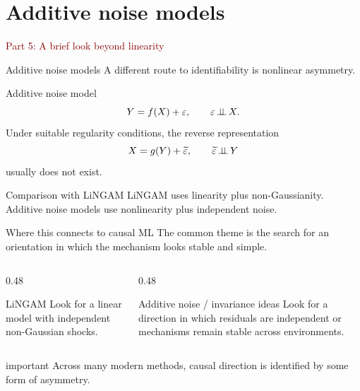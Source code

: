 \documentclass[dvipsnames,aspectratio=169,handout]{beamer}
\begin{document}

\section{Additive noise models}

\begin{frame}{}
\begin{center}
{\Huge \textcolor{DarkRed}{Part 5: A brief look beyond linearity}}
\end{center}
\end{frame}

\begin{frame}{Additive noise models}
A different route to identifiability is nonlinear asymmetry.

\begin{block}{Additive noise model}
\[
Y = f(X) + \varepsilon,
\qquad
\varepsilon \mbox{\,$\perp\!\!\!\perp$\,} X.
\]
Under suitable regularity conditions, the reverse representation
\[
X = g(Y) + \widetilde\varepsilon,
\qquad
\widetilde\varepsilon \mbox{\,$\perp\!\!\!\perp$\,} Y
\]
usually does not exist.
\end{block}

\begin{alertblock}{Comparison with LiNGAM}
LiNGAM uses linearity plus non-Gaussianity.
Additive noise models use nonlinearity plus independent noise.
\end{alertblock}
\end{frame}

\begin{frame}{Where this connects to causal ML}
The common theme is the search for an orientation in which the mechanism looks stable and simple.

\begin{columns}[T]
\begin{column}{0.48\textwidth}
\begin{block}{LiNGAM}
Look for a linear model with independent non-Gaussian shocks.
\end{block}
\end{column}
\begin{column}{0.48\textwidth}
\begin{block}{Additive noise / invariance ideas}
Look for a direction in which residuals are independent or mechanisms remain stable across environments.
\end{block}
\end{column}
\end{columns}

\begin{beamercolorbox}[wd=\textwidth,sep=7pt,center,rounded=true,shadow=true]{important}
Across many modern methods, causal direction is identified by some form of asymmetry.
\end{beamercolorbox}
\end{frame}
\end{document}
